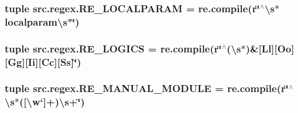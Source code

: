 \hypertarget{namespacesrc_1_1regex_ae43e1bd4a4c2138510ad6a466f919380}{
\subsubsection[{R\-E\-\_\-\-L\-O\-C\-A\-L\-P\-A\-R\-A\-M}]{\setlength{\rightskip}{0pt plus 5cm}tuple src.\-regex.\-R\-E\-\_\-\-L\-O\-C\-A\-L\-P\-A\-R\-A\-M = re.\-compile(r\char`\"{}$^\wedge$\textbackslash{}s$\ast$localparam\textbackslash{}s$\ast$\char`\"{})}}\label{namespacesrc_1_1regex_ae43e1bd4a4c2138510ad6a466f919380}
\hypertarget{namespacesrc_1_1regex_abbb4440391681e05336f4c523b2df528}{
\subsubsection[{R\-E\-\_\-\-L\-O\-G\-I\-C\-S}]{\setlength{\rightskip}{0pt plus 5cm}tuple src.\-regex.\-R\-E\-\_\-\-L\-O\-G\-I\-C\-S = re.\-compile(r\char`\"{}$^\wedge$(\textbackslash{}s$\ast$)\&\mbox{[}Ll\mbox{]}\mbox{[}Oo\mbox{]}\mbox{[}Gg\mbox{]}\mbox{[}Ii\mbox{]}\mbox{[}Cc\mbox{]}\mbox{[}Ss\mbox{]}\char`\"{})}}\label{namespacesrc_1_1regex_abbb4440391681e05336f4c523b2df528}
\hypertarget{namespacesrc_1_1regex_a651a9fb141d3d150d175a02fb9acaf6b}{
\subsubsection[{R\-E\-\_\-\-M\-A\-N\-U\-A\-L\-\_\-\-M\-O\-D\-U\-L\-E}]{\setlength{\rightskip}{0pt plus 5cm}tuple src.\-regex.\-R\-E\-\_\-\-M\-A\-N\-U\-A\-L\-\_\-\-M\-O\-D\-U\-L\-E = re.\-compile(r\char`\"{}$^\wedge$\textbackslash{}s$\ast$(\mbox{[}\textbackslash{}w`\mbox{]}+)\textbackslash{}s+\char`\"{})}}\label{namespacesrc_1_1regex_a651a9fb141d3d150d175a02fb9acaf6b}
